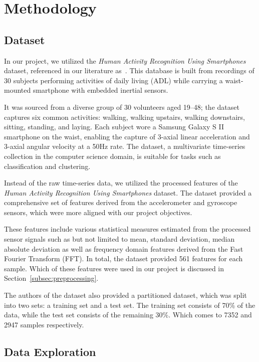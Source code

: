 \section{Methodology}\label{sec:methology}

\subsection{Dataset}\label{subsec:dataset}

In our project, we utilized the \emph{Human Activity Recognition Using Smartphones} dataset, referenced in our literature as~\cite{misc_human_activity_recognition_using_smartphones_240}.
This database is built from recordings of 30 subjects performing activities of daily living (ADL) while carrying a waist-mounted smartphone with embedded inertial sensors.

It was sourced from a diverse group of 30 volunteers aged 19--48; the dataset captures six common activities: walking, walking upstairs, walking downstairs, sitting, standing, and laying.
Each subject wore a Samsung Galaxy S II smartphone on the waist, enabling the capture of 3-axial linear acceleration and 3-axial angular velocity at a 50Hz rate.
The dataset, a multivariate time-series collection in the computer science domain, is suitable for tasks such as classification and clustering.

Instead of the raw time-series data, we utilized the processed features of the \emph{Human Activity Recognition Using Smartphones} dataset.
The dataset provided a comprehensive set of features derived from the accelerometer and gyroscope sensors, which were more aligned with our project objectives.

These features include various statistical measures estimated from the processed sensor signals such as but not limited to mean, standard deviation, median absolute deviation as well as frequency domain features derived from the Fast Fourier Transform (FFT).
In total, the dataset provided 561 features for each sample.
Which of these features were used in our project is discussed in Section~\ref{subsec:preprocessing}.

The authors of the dataset also provided a partitioned dataset, which was split into two sets: a training set and a test set.
The training set consists of 70\% of the data, while the test set consists of the remaining 30\%.
Which comes to 7352 and 2947 samples respectively.

\subsection{Data Exploration}\label{subsec:data-exploration}

